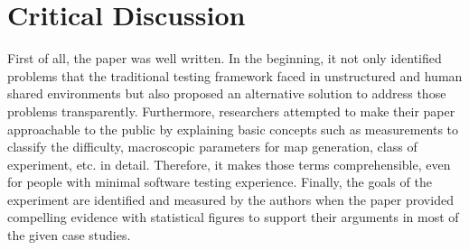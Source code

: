 \documentclass[10pt,a4paper]{report}
\begin{document}
%



\section{Critical Discussion}
First of all, the paper was well written. In the beginning, it not only identified problems that the traditional testing framework faced in unstructured and human shared environments but also proposed an alternative solution to address those problems transparently.
%
Furthermore, researchers attempted to make their paper approachable to the public by explaining basic concepts such as measurements to classify the difficulty, macroscopic parameters for map generation, class of experiment, etc. in detail. Therefore, it makes those terms comprehensible, even for people with minimal software testing experience.  
%
Finally, the goals of the experiment are identified and measured by the authors when the paper provided compelling evidence with statistical figures to support their arguments in most of the given case studies.
%
\end{document}
